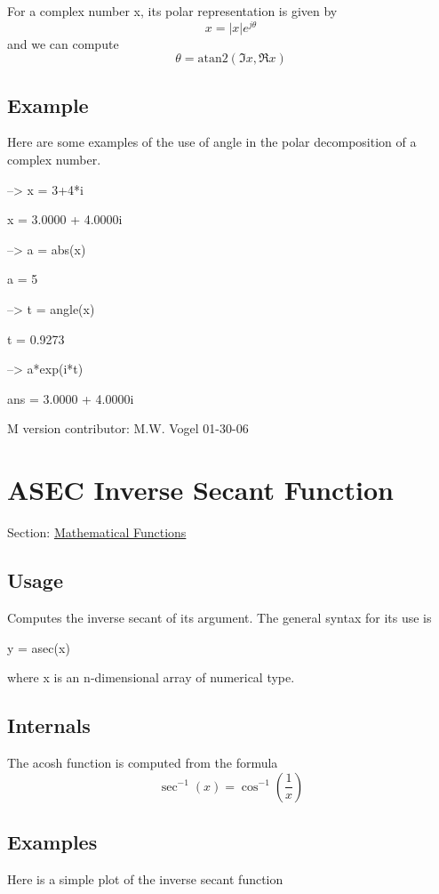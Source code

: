 For a complex number {\ttfamily x}, its polar representation is given by \[ x = |x| e^{j\theta} \] and we can compute \[ \theta = \mathrm{atan2}(\Im x, \Re x) \] \hypertarget{variables_struct_Example}{}\subsection{Example}\label{variables_struct_Example}
Here are some examples of the use of {\ttfamily angle} in the polar decomposition of a complex number.


\begin{DoxyVerbInclude}
--> x = 3+4*i

x = 
   3.0000 +  4.0000i 

--> a = abs(x)

a = 
 5 

--> t = angle(x)

t = 
    0.9273 

--> a*exp(i*t)

ans = 
   3.0000 +  4.0000i 
\end{DoxyVerbInclude}


M version contributor\-: M.\-W. Vogel 01-\/30-\/06 \hypertarget{mathfunctions_asec}{}\section{A\-S\-E\-C Inverse Secant Function}\label{mathfunctions_asec}
Section\-: \hyperlink{sec_mathfunctions}{Mathematical Functions} \hypertarget{vtkwidgets_vtkxyplotwidget_Usage}{}\subsection{Usage}\label{vtkwidgets_vtkxyplotwidget_Usage}
Computes the inverse secant of its argument. The general syntax for its use is \begin{DoxyVerb}  y = asec(x)
\end{DoxyVerb}
 where {\ttfamily x} is an {\ttfamily n}-\/dimensional array of numerical type. \hypertarget{transforms_svd_Function}{}\subsection{Internals}\label{transforms_svd_Function}
The {\ttfamily acosh} function is computed from the formula \[ \sec^{-1}(x) = \cos^{-1}\left(\frac{1}{x}\right) \] \hypertarget{variables_matrix_Examples}{}\subsection{Examples}\label{variables_matrix_Examples}
Here is a simple plot of the inverse secant function


